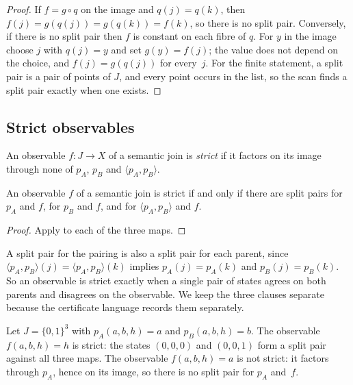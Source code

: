 \begin{proof}
If $f=g\circ q$ on the image and $q(j)=q(k)$, then $f(j)=g(q(j))=g(q(k))=f(k)$, so there is
no split pair. Conversely, if there is no split pair then $f$ is constant on each fibre of
$q$. For $y$ in the image choose $j$ with $q(j)=y$ and set $g(y)=f(j)$; the value does not
depend on the choice, and $f(j)=g(q(j))$ for every~$j$. For the finite statement, a split
pair is a pair of points of $J$, and every point occurs in the list, so the scan finds a
split pair exactly when one exists.
\end{proof}

\subsection{Strict observables}

\begin{definition}
\label{def:strict-observable}
An observable $f:J\to X$ of a semantic join is \emph{strict} if it factors on its image
through none of $p_A$, $p_B$ and $\langle p_A,p_B\rangle$.
\end{definition}

\begin{theorem}
\label{thm:strict-split}
An observable $f$ of a semantic join is strict if and only if there are split pairs for
$p_A$ and $f$, for $p_B$ and $f$, and for $\langle p_A,p_B\rangle$ and $f$.
\end{theorem}

\begin{proof}
Apply  to each of the three maps.
\end{proof}

A split pair for the pairing is also a split pair for each parent, since
$\langle p_A,p_B\rangle(j)=\langle p_A,p_B\rangle(k)$ implies $p_A(j)=p_A(k)$ and
$p_B(j)=p_B(k)$. So an observable is strict exactly when a single pair of states agrees on
both parents and disagrees on the observable. We keep the three clauses separate because
the certificate language records them separately.

\begin{example}
\label{ex:cube}
Let $J=\{0,1\}^3$ with $p_A(a,b,h)=a$ and $p_B(a,b,h)=b$. The observable $f(a,b,h)=h$ is
strict: the states $(0,0,0)$ and $(0,0,1)$ form a split pair against all three maps. The
observable $f(a,b,h)=a$ is not strict: it factors through $p_A$, hence on its image, so there is no split pair
for $p_A$ and~$f$.
\end{example}

